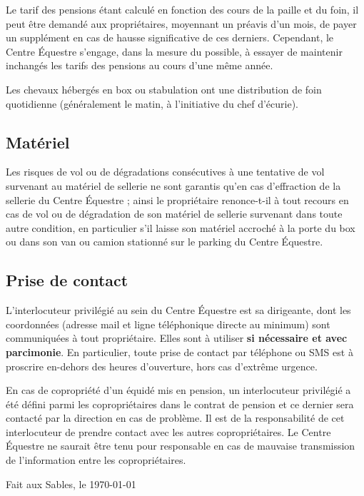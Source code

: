 \documentclass[11pt,a4paper]{article}
\begin{document}
Le tarif des pensions étant calculé en fonction des cours de la paille et du foin, il peut être demandé aux propriétaires, moyennant un préavis d'un mois, de payer un supplément en cas de hausse significative de ces derniers.
Cependant, le Centre Équestre s'engage, dans la mesure du possible, à essayer de maintenir inchangés les tarifs des pensions au cours d'une même année.

Les chevaux hébergés en box ou stabulation ont une distribution de foin quotidienne (généralement le matin, à l'initiative du chef d'écurie).

\subsection*{Matériel}
Les risques de vol ou de dégradations consécutives à une tentative de vol survenant au matériel de sellerie ne sont garantis qu'en cas d'effraction de la sellerie du Centre Équestre ; ainsi le propriétaire renonce-t-il à tout recours en cas de vol ou de dégradation de son matériel de sellerie survenant dans toute autre condition, en particulier s'il laisse son matériel accroché à la porte du box ou dans son van ou camion stationné sur le parking du Centre Équestre.

\subsection*{Prise de contact}
	L'interlocuteur privilégié au sein du Centre Équestre est sa dirigeante, dont les coordonnées (adresse mail et ligne téléphonique directe au minimum) sont communiquées à tout propriétaire.
	Elles sont à utiliser \textbf{si nécessaire et avec parcimonie}.
	En particulier, toute prise de contact par téléphone ou SMS est à proscrire en-dehors des heures d'ouverture, hors cas d'extrême urgence.

	En cas de copropriété d'un équidé mis en pension, un interlocuteur privilégié a été défini parmi les copropriétaires dans le contrat de pension et ce dernier sera contacté par la direction en cas de problème.
	Il est de la responsabilité de cet interlocuteur de prendre contact avec les autres copropriétaires.
	Le Centre Équestre ne saurait être tenu pour responsable en cas de mauvaise transmission de l'information entre les copropriétaires.

\vfill
\begin{flushright}
	Fait aux Sables, le \today
\end{flushright}
\end{document}
